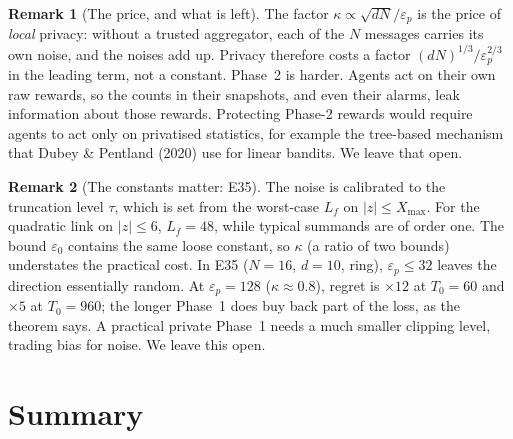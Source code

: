 \documentclass[11pt]{article}
\theoremstyle{definition}
\newtheorem{remark}{Remark}
\newcommand{\Xmax}{X_{\max}}
\newcommand{\eps}{\varepsilon}
\begin{document}
\begin{remark}[The price, and what is left]
The factor $\kappa\propto\sqrt{dN}/\varepsilon_p$ is the price of \emph{local} privacy: without a trusted aggregator, each
of the $N$ messages carries its own noise, and the noises add up. Privacy therefore costs a factor
$(dN)^{1/3}/\varepsilon_p^{2/3}$ in the leading term, not a constant. Phase~2 is harder. Agents act on their own raw
rewards, so the counts in their snapshots, and even their alarms, leak information about those rewards. Protecting
Phase-2 rewards would require agents to act only on privatised statistics, for example the tree-based mechanism that
Dubey \& Pentland (2020) use for linear bandits. We leave that open.
\end{remark}

\begin{remark}[The constants matter: E35]
The noise is calibrated to the truncation level $\tau$, which is set from the worst-case $L_f$ on $|z|\le\Xmax$. For the
quadratic link on $|z|\le6$, $L_f=48$, while typical summands are of order one. The bound $\eps_0$ contains the same
loose constant, so $\kappa$ (a ratio of two bounds) understates the practical cost. In E35 ($N=16$, $d=10$, ring),
$\varepsilon_p\le32$ leaves the direction essentially random. At $\varepsilon_p=128$ ($\kappa\approx0.8$), regret is
$\times12$ at $T_0=60$ and $\times5$ at $T_0=960$; the longer Phase~1 does buy back part of the loss, as the theorem
says. A practical private Phase~1 needs a much smaller clipping level, trading bias for noise. We leave this open.
\end{remark}

\section{Summary}
\end{document}
